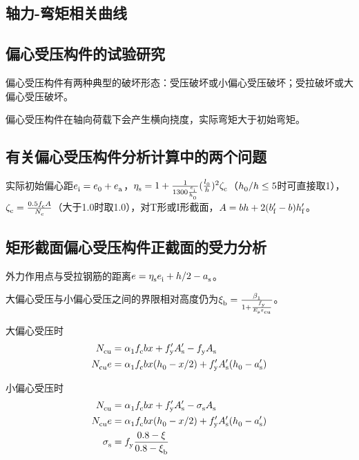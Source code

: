 \documentclass{article}
\begin{document}
\subsection{轴力-弯矩相关曲线}
\subsection{偏心受压构件的试验研究}
\par 偏心受压构件有两种典型的破坏形态：受压破坏或小偏心受压破坏；受拉破坏或大偏心受压破坏。
\par 偏心受压构件在轴向荷载下会产生横向挠度，实际弯矩大于初始弯矩。
\subsection{有关偏心受压构件分析计算中的两个问题}
\par 实际初始偏心距$\script{e}{i}=\script{e}{0}+\script{e}{a}$，$\script{\eta}{s}=1+\frac{1}{1300\frac{\script{e}{i}}{\script{h}{0}}}(\frac{\script{l}{0}}{h})^2\script{\zeta}{c}$（$\script{h}{0}/h\le5$时可直接取1），$\script{\zeta}{c}=\frac{0.5\script{f}{c}A}{\script{N}{c}}$（大于1.0时取1.0），对T形或I形截面，$A=bh+2(\script{b}[\prime]{f}-b)\script{h}[\prime]{f}$。
\par \sc
\subsection{矩形截面偏心受压构件正截面的受力分析}
\par 外力作用点与受拉钢筋的距离$e=\script{\eta}{s}\script{e}{i}+h/2-\script{a}{s}$。
\par 大偏心受压与小偏心受压之间的界限相对高度仍为$\script{\xi}{b}=\frac{\script{\beta}{1}}{1+\frac{\script{f}{y}}{\script{E}{s}\script{\varepsilon}{cu}}}$。
\par 大偏心受压时
\begin{align}
      \script{N}{cu}  & = \script{\alpha}{1}\script{f}{c}bx+\script{f}[\prime]{y}\script{A}[\prime]{s}-\script{f}{y}\script{A}{s}                                                \\
      \script{N}{cu}e & = \script{\alpha}{1}\script{f}{c}bx(\script{h}{0}-x/2)+\script{f}[\prime]{y}\script{A}[\prime]{s}(\script{h}{0}-\script{a}[\prime]{s})\label{eq:大偏心受压力矩}
\end{align}
\par 小偏心受压时
\begin{align}
      \script{N}{cu}     & = \script{\alpha}{1}\script{f}{c}bx+\script{f}[\prime]{y}\script{A}[\prime]{s}-\script{\sigma}{s}\script{A}{s}                                            \\
      \script{N}{cu}e    & = \script{\alpha}{1}\script{f}{c}bx(\script{h}{0}-x/2)+\script{f}[\prime]{y}\script{A}[\prime]{s}(\script{h}{0}-\script{a}[\prime]{s}) \label{eq:小偏心受压力矩} \\
      \script{\sigma}{s} & = \script{f}{y}\frac{0.8-\xi}{0.8-\script{\xi}{b}}
\end{align}
\end{document}
